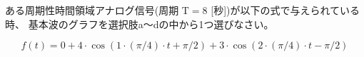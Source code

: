 ある周期性時間領域アナログ信号(周期 $\textrm{T} = 8$ [秒])が以下の式で与えられている時、
基本波のグラフを選択肢a〜dの中から1つ選びなさい。

\[
f(t) = 
0
+ 4 \cdot \cos( 1 \cdot ( \pi/4 ) \cdot t + \pi/2  )
+ 3 \cdot \cos( 2 \cdot ( \pi/4 ) \cdot t - \pi/2 )
\]
